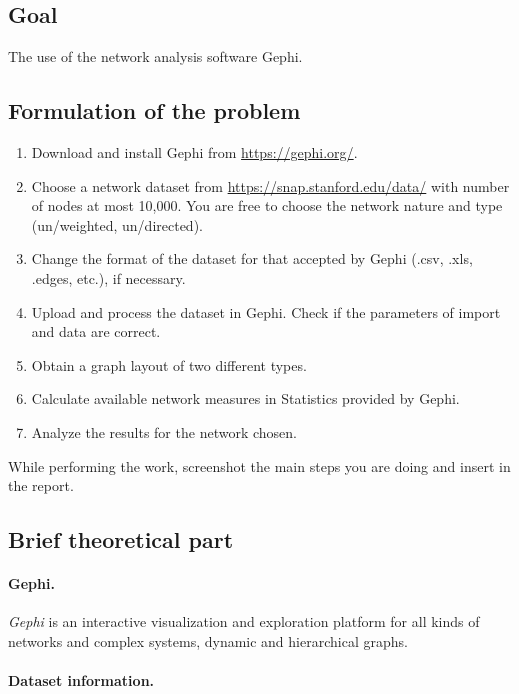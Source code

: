 \newpage
\subsection{Goal}\label{subsec:goal}

The use of the network analysis software Gephi.

\subsection{Formulation of the problem}\label{subsec:formulation-of-the-problem}

\begin{enumerate}
    \item Download and install Gephi from \url{https://gephi.org/}.
    \item Choose a network dataset from \url{https://snap.stanford.edu/data/} with number of nodes at most 10,000.
    You are free to choose the network nature and type (un/weighted, un/directed).
    \item Change the format of the dataset for that accepted by Gephi (.csv, .xls, .edges, etc.), if necessary.
    \item Upload and process the dataset in Gephi. Check if the parameters of import and data are correct.
    \item Obtain a graph layout of two different types.
    \item Calculate available network measures in Statistics provided by Gephi.
    \item Analyze the results for the network chosen.
\end{enumerate}

While performing the work, screenshot the main steps you are doing and insert in the report.

\subsection{Brief theoretical part}\label{subsec:brief-theoretical-part}

\paragraph{Gephi.}

\textit{Gephi} is an interactive visualization and exploration platform for all kinds of networks and complex systems, dynamic and hierarchical graphs.

\paragraph{Dataset information.}

